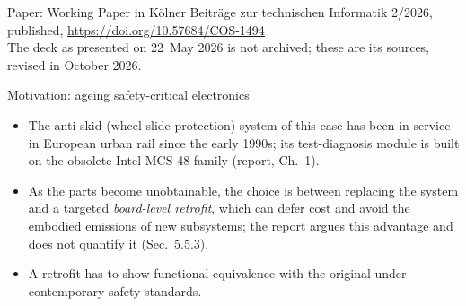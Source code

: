 %

\begin{frame}[plain]
  \titlepage
  \vspace{-1.5em}
  \begin{center}\scriptsize
    Paper: Working Paper in K\"olner Beitr\"age zur technischen Informatik 2/2026, published, \url{https://doi.org/10.57684/COS-1494}\\[2pt]
    {\color{inkgray}The deck as presented on 22~May 2026 is not archived; these are its sources, revised in October 2026.}
  \end{center}
\end{frame}

\begin{frame}{Motivation: ageing safety-critical electronics}
  \begin{itemize}
    \item The anti-skid (wheel-slide protection) system of this case has been in service in European urban rail since the early 1990s; its test-diagnosis module is built on the obsolete Intel MCS-48 family (report, Ch.~1).
    \item As the parts become unobtainable, the choice is between replacing the system and a targeted \emph{board-level retrofit}, which can defer cost and avoid the embodied emissions of new subsystems; the report argues this advantage and does not quantify it (Sec.~5.5.3).
    \item A retrofit has to show \alert{functional equivalence} with the original under contemporary safety standards.
  \end{itemize}
\end{frame}

